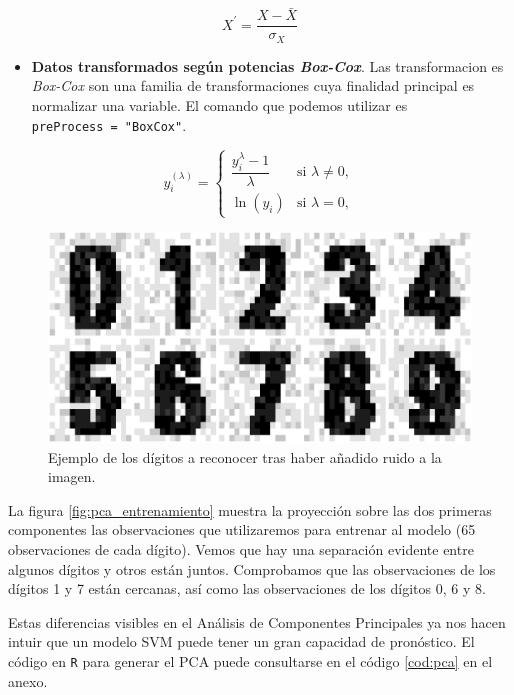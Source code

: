 \documentclass[12pt,spanish,a4paper]{article}
\providecommand{\tightlist}{%
  \setlength{\itemsep}{0pt}\setlength{\parskip}{0pt}}
\numberwithin{equation}{section}
\begin{document}
\begin{equation}
  X^{\prime} = \dfrac{X -\bar{X}}{\sigma_{X}}
  \end{equation}

\begin{itemize}
\tightlist
\item
  \textbf{Datos transformados según potencias \emph{Box-Cox}}. Las
  transformacion es \emph{Box-Cox} son una familia de transformaciones
  cuya finalidad principal es normalizar una variable. El comando que
  podemos utilizar es \texttt{preProcess\ =\ "BoxCox"}.
\end{itemize}

\begin{equation}
  y_{i}^{(\lambda )}={\begin{cases}{\dfrac {y_{i}^{\lambda }-1}{\lambda }}&{\text{si }}\lambda \neq 0,\\[8pt]\ln {(y_{i})}&{\text{si }}\lambda =0,\end{cases}}
  \end{equation}

\begin{figure}[h]

{\centering \includegraphics[width=0.8\linewidth]{graphics/svm/imagen_digitos_jitter-1} 

}

\caption{Ejemplo  de los dígitos a reconocer tras haber añadido ruido a la imagen.}\label{fig:imagen_digitos_jitter}
\end{figure}

La figura \ref{fig:pca_entrenamiento} muestra la proyección sobre las
dos primeras componentes las observaciones que utilizaremos para
entrenar al modelo (65 observaciones de cada dígito). Vemos que hay una
separación evidente entre algunos dígitos y otros están juntos.
Comprobamos que las observaciones de los dígitos 1 y 7 están cercanas,
así como las observaciones de los dígitos 0, 6 y 8.

Estas diferencias visibles en el Análisis de Componentes Principales ya
nos hacen intuir que un modelo SVM puede tener un gran capacidad de
pronóstico. El código en \texttt{R} para generar el PCA puede
consultarse en el código \ref{cod:pca} en el anexo.
\end{document}
